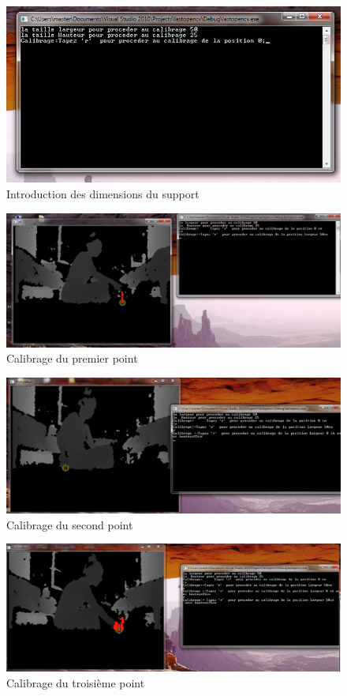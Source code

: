 \documentclass[12pt,a4paper,oneside]{book}
\begin{document}
	\begin{figure}[H]	\centering
		\includegraphics[scale=0.7]{it2.png}
		\caption{Introduction des dimensions du support}
		\label{fig9}
	\end{figure}
	
	\begin{figure}[H]
		\centering
		\includegraphics[scale=0.47]{it3.png}
		\caption{Calibrage du premier point}
		\label{fig10}
	\end{figure}
	
	\begin{figure}[H]
		\centering
		\includegraphics[scale=0.47]{it4.png}
		\caption{Calibrage du second point}
		\label{fig11}
	\end{figure}
	
	\begin{figure}[H]
		\centering
		\includegraphics[scale=0.47]{it6.png}
		\caption{Calibrage du troisième point}
		\label{fig16}
		
	\end{figure}
	
\end{document}
